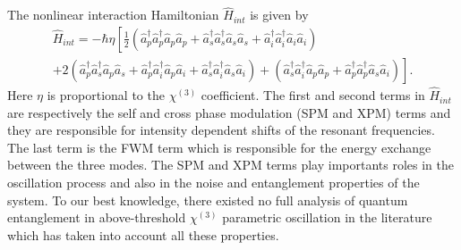 \documentclass[aps,prl,twocolumn,groupedaddress]{revtex4-1}
\begin{document}
The nonlinear interaction Hamiltonian $\hat{H}_{int}$ is given by
\begin{gather*}
\hat{H}_{int}=-\hbar \eta\left[ \frac{1}{2}\left(\hat{a}^{\dagger}_p\hat{a}^{\dagger}_p\hat{a}_p\hat{a}_p+\hat{a}^{\dagger}_s\hat{a}^{\dagger}_s\hat{a}_s\hat{a}_s+\hat{a}^{\dagger}_i\hat{a}^{\dagger}_i\hat{a}_i\hat{a}_i\right) \right.\nonumber\\ +2\left(\hat{a}^{\dagger}_p\hat{a}^{\dagger}_s\hat{a}_p\hat{a}_s+\hat{a}^{\dagger}_p\hat{a}^{\dagger}_i\hat{a}_p\hat{a}_i+\hat{a}^{\dagger}_s\hat{a}^{\dagger}_i\hat{a}_s\hat{a}_i\right)
+\left. \left(\hat{a}^{\dagger}_s\hat{a}^{\dagger}_i\hat{a}_p\hat{a}_p +\hat{a}^{\dagger}_p\hat{a}^{\dagger}_p\hat{a}_s\hat{a}_i  \right)\right].
\end{gather*} Here $\eta$ is proportional to the $\chi^{(3)}$ coefficient. The first and second terms in $\hat{H}_{int}$ are respectively the self and cross phase modulation (SPM and XPM) terms and they are responsible for intensity dependent shifts of the resonant frequencies. The last term is the FWM term which is responsible for the energy exchange between the three modes. The SPM and XPM terms play importants roles in the oscillation process and also in the noise and entanglement properties of the system. To our best knowledge, there existed no full analysis of quantum entanglement in above-threshold $\chi^{(3)}$ parametric oscillation in the literature which has taken into account all these properties.
\end{document}
